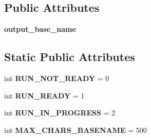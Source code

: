 \subsection*{Public Attributes}
\begin{DoxyCompactItemize}
\item 
{\bfseries output\+\_\+base\+\_\+name}\hypertarget{classnegui_1_1pgguisimupop_1_1PGGuiSimuPop_aa5f9f17f0527c20e5556b574a3f97300}{}\label{classnegui_1_1pgguisimupop_1_1PGGuiSimuPop_aa5f9f17f0527c20e5556b574a3f97300}

\end{DoxyCompactItemize}
\subsection*{Static Public Attributes}
\begin{DoxyCompactItemize}
\item 
int {\bfseries R\+U\+N\+\_\+\+N\+O\+T\+\_\+\+R\+E\+A\+DY} = 0\hypertarget{classnegui_1_1pgguisimupop_1_1PGGuiSimuPop_ae82d4be656ee869a30087fe2bab1410e}{}\label{classnegui_1_1pgguisimupop_1_1PGGuiSimuPop_ae82d4be656ee869a30087fe2bab1410e}

\item 
int {\bfseries R\+U\+N\+\_\+\+R\+E\+A\+DY} = 1\hypertarget{classnegui_1_1pgguisimupop_1_1PGGuiSimuPop_ab29a3c49b505f46c6a648dce7772fa80}{}\label{classnegui_1_1pgguisimupop_1_1PGGuiSimuPop_ab29a3c49b505f46c6a648dce7772fa80}

\item 
int {\bfseries R\+U\+N\+\_\+\+I\+N\+\_\+\+P\+R\+O\+G\+R\+E\+SS} = 2\hypertarget{classnegui_1_1pgguisimupop_1_1PGGuiSimuPop_a023efccec69461c3f9898383c24bb24b}{}\label{classnegui_1_1pgguisimupop_1_1PGGuiSimuPop_a023efccec69461c3f9898383c24bb24b}

\item 
int {\bfseries M\+A\+X\+\_\+\+C\+H\+A\+R\+S\+\_\+\+B\+A\+S\+E\+N\+A\+ME} = 500\hypertarget{classnegui_1_1pgguisimupop_1_1PGGuiSimuPop_a75a723ea82c8855efce337740a1e4c91}{}\label{classnegui_1_1pgguisimupop_1_1PGGuiSimuPop_a75a723ea82c8855efce337740a1e4c91}

\end{DoxyCompactItemize}



